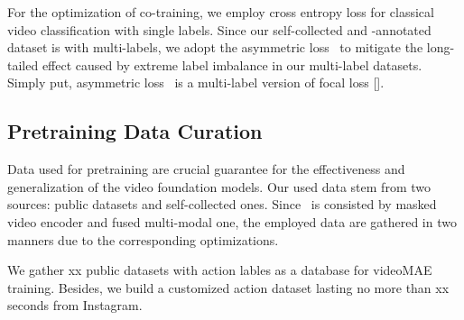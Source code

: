 For the optimization of co-training, we employ cross entropy loss for classical video classification with single labels. Since our self-collected and -annotated dataset is with multi-labels, we adopt the asymmetric loss~\cite{asl} to mitigate the long-tailed effect caused by extreme label imbalance in our multi-label datasets. Simply put, asymmetric loss~\cite{asl} is a multi-label version of focal loss [].



%

\subsection{Pretraining Data Curation}
Data used for pretraining are crucial guarantee for the effectiveness and generalization of the video foundation models. Our used data stem from two sources: public datasets and self-collected ones. Since \model~is consisted by masked video encoder and fused multi-modal one, the employed data are gathered in two manners due to the corresponding optimizations. 

We gather xx public datasets with action lables as a database for videoMAE training. Besides, we build a customized action dataset lasting no more than xx seconds from Instagram.

